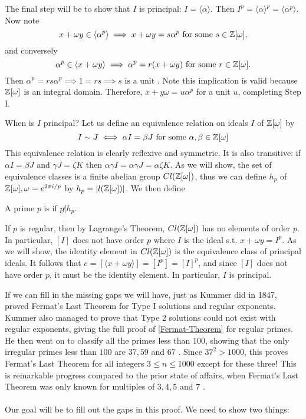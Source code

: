 The final step will be to show that $I$ is principal: $I=\langle \alpha \rangle$. Then $I^p=\langle \alpha \rangle ^p=\langle \alpha^p \rangle$. Now note $$x+\omega y\in\langle \alpha^p\rangle\implies x+\omega y =s\alpha^p\text{ for some }s\in \mathbb{Z}[\omega],$$ and conversely $$\alpha^p\in \langle x+\omega y\rangle \implies \alpha^p=r(x+\omega y)\text{ for some }r\in \mathbb{Z}[\omega].$$ Then $\alpha^p=rs\alpha^p\implies 1=rs\implies s \text{ is a unit .}$ Note this implication is valid because $\mathbb{Z}[\omega]$ is an integral domain. Therefore, $x+y\omega=u\alpha^p$ for a unit $u$, completing Step I.

When is $I$ principal? Let us define an equivalence relation on ideals $I$ of $\mathbb{Z}[\omega]$ by
$$I\sim J \iff \alpha I=\beta J \text{ for some } \alpha,\beta\in \mathbb{Z}[\omega]$$
This equivalence relation is clearly reflexive and symmetric. It is also transitive: if $\alpha I=\beta J$ and $\gamma J=\zeta K$ then $\alpha\gamma I=\alpha \gamma J=\alpha \zeta K$. As we will show, the set of equivalence classes is a finite abelian group $Cl(\mathbb{Z}[\omega])$, thus we can define  $h_p$ of $\mathbb{Z}[\omega],\omega=e^{2\pi i/p}$ by $h_p=|l(\mathbb{Z}[\omega])|$. We then define
\begin{definition}
A prime $p$ is  if $p\not | h_p$.
\end{definition}
If $p$ is regular, then by Lagrange's Theorem, $Cl(\mathbb{Z}[\omega])$ has no elements of order $p$. In particular, $[I]$ does not have order $p$ where $I$ is the ideal s.t. $x+\omega y=I^p$. As we will show, the identity element in $Cl(\mathbb{Z}[\omega])$ is the equivalence class of principal ideals. It follows that $e=[\langle x+\omega y\rangle]=[I^p]=[I]^p$, and since $[I]$ does not have order $p$, it must be the identity element. In particular, $I$ is principal.

If we can fill in the missing gaps we will have, just as Kummer did in 1847, proved Fermat's Last Theorem for Type I solutions and regular exponents. Kummer also managed to prove that Type 2 solutions could not exist with regular exponents, giving the full proof of \cref{Fermat-Theorem} for regular primes. He then went on to classify all the primes less than $100$, showing that the only irregular primes less than $100$ are $37, 59$ and $67$ \cite{Wright}. Since $37^2>1000$, this proves Fermat's Last Theorem for all integers $3\leq n\leq 1000$ except for these three! This is remarkable progress compared to the prior state of affairs, when Fermat's Last Theorem was only known for multiples of $3,4,5$ and $7$ \cite{History}.
\\ \\
Our goal will be to fill out the gaps in this proof. We need to show two things:

